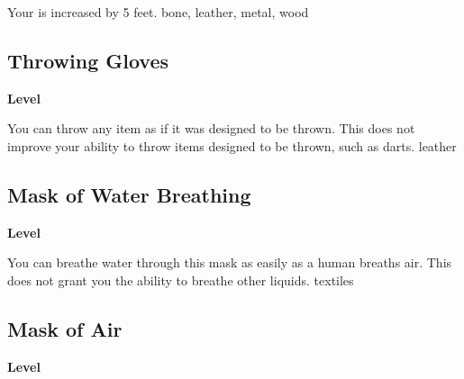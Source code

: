 \vspace{-1.5em}  %
Your  is increased by 5 feet.
 
 bone, leather, metal, wood
\begin{multicols}{2}
\lowercase{\hypertarget{item:Throwing Gloves}{}}\label{item:Throwing Gloves}
\hypertarget{item:Throwing Gloves}{\subsection{Throwing Gloves}}
\columnbreak%
\begin{flushright}
\large\textbf{ Level}
\end{flushright}
\end{multicols}
\vspace{-1.5em}  %
You can throw any item as if it was designed to be thrown.
This does not improve your ability to throw items designed to be thrown, such as darts.
 
 leather
\begin{multicols}{2}
\lowercase{\hypertarget{item:Mask of Water Breathing}{}}\label{item:Mask of Water Breathing}
\hypertarget{item:Mask of Water Breathing}{\subsection{Mask of Water Breathing}}
\columnbreak%
\begin{flushright}
\large\textbf{ Level}
\end{flushright}
\end{multicols}
\vspace{-1.5em}  %
You can breathe water through this mask as easily as a human breaths air.
This does not grant you the ability to breathe other liquids.
 
 textiles
\begin{multicols}{2}
\lowercase{\hypertarget{item:Mask of Air}{}}\label{item:Mask of Air}
\hypertarget{item:Mask of Air}{\subsection{Mask of Air}}
\columnbreak%
\begin{flushright}
\large\textbf{ Level}
\end{flushright}
\end{multicols}

